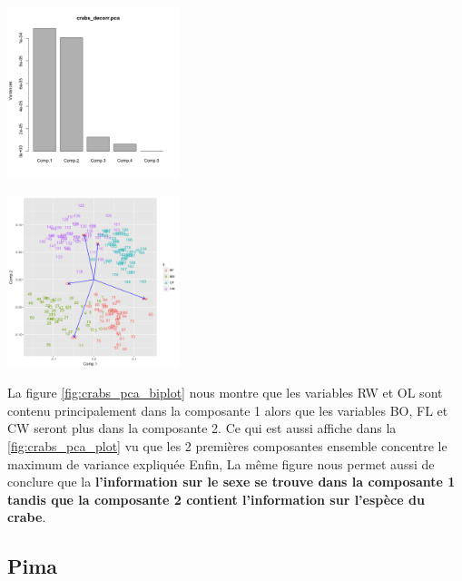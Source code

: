 \documentclass[10pt]{article}
\begin{document}
	\begin{minipage}{.5\textwidth}
		\centering
		\includegraphics[width=50mm]{Figures/Crabs/decorr_pca_plot.png}
		\label{fig:crabs_pca_plot}
	\end{minipage}%
	\hspace{0.08\linewidth}
	\begin{minipage}{.5\textwidth}
		\centering
		\includegraphics[width=50mm]{Figures/Crabs/decorr_pca_biplot.png}
		\label{fig:crabs_pca_biplot}
	\end{minipage}
	
	\vspace{2mm}
	La figure  \ref{fig:crabs_pca_biplot} nous montre que les variables RW et OL sont contenu principalement dans la composante 1 alors que les variables BO, FL et CW seront plus dans la composante 2. Ce qui est aussi affiche dans la \ref{fig:crabs_pca_plot} vu que les 2 premières composantes ensemble concentre le maximum de variance expliquée Enfin, La même figure nous permet aussi de conclure que la \textbf{l'information sur le sexe se trouve dans la composante 1 tandis que la composante 2 contient l'information sur l'espèce du crabe}. 
	\subsection{Pima}
	
\end{document}
